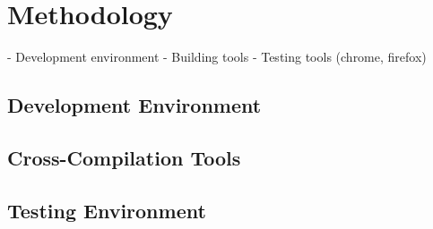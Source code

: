 \chapter{Methodology}\label{cha:methodology}

- Development environment
- Building tools
- Testing tools (chrome, firefox)


\section{Development Environment}\label{sec:devenv}


\section{Cross-Compilation Tools}\label{sec:cross}


\section{Testing Environment}\label{sec:testing}